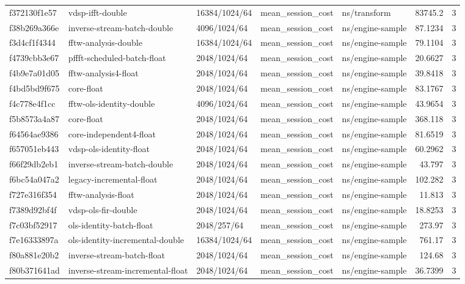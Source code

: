 \begin{longtable}{lllllrr}
f372130f1e57 & vdsp-ifft-double & 16384/1024/64 & mean\_session\_cost & ns/transform & 83745.2 & 3 \\
f38b269a366e & inverse-stream-batch-double & 4096/1024/64 & mean\_session\_cost & ns/engine-sample & 87.1234 & 3 \\
f3d4cf1f4344 & fftw-analysis-double & 16384/1024/64 & mean\_session\_cost & ns/engine-sample & 79.1104 & 3 \\
f4739cbb3e67 & pffft-scheduled-batch-float & 2048/1024/64 & mean\_session\_cost & ns/engine-sample & 20.6627 & 3 \\
f4b9e7a01d05 & fftw-analysis4-float & 2048/1024/64 & mean\_session\_cost & ns/engine-sample & 39.8418 & 3 \\
f4bd5bd9f675 & core-float & 2048/1024/64 & mean\_session\_cost & ns/engine-sample & 83.1767 & 3 \\
f4c778e4f1cc & fftw-ols-identity-double & 4096/1024/64 & mean\_session\_cost & ns/engine-sample & 43.9654 & 3 \\
f5b8573a4a87 & core-float & 2048/1024/64 & mean\_session\_cost & ns/engine-sample & 368.118 & 3 \\
f64564ae9386 & core-independent4-float & 2048/1024/64 & mean\_session\_cost & ns/engine-sample & 81.6519 & 3 \\
f657051eb443 & vdsp-ols-identity-float & 2048/1024/64 & mean\_session\_cost & ns/engine-sample & 60.2962 & 3 \\
f66f29db2eb1 & inverse-stream-batch-double & 2048/1024/64 & mean\_session\_cost & ns/engine-sample & 43.797 & 3 \\
f6bc54a047a2 & legacy-incremental-float & 2048/1024/64 & mean\_session\_cost & ns/engine-sample & 102.282 & 3 \\
f727e316f354 & fftw-analysis-float & 2048/1024/64 & mean\_session\_cost & ns/engine-sample & 11.813 & 3 \\
f7389d92bf4f & vdsp-ols-fir-double & 2048/1024/64 & mean\_session\_cost & ns/engine-sample & 18.8253 & 3 \\
f7c03bf52917 & ols-identity-batch-float & 2048/257/64 & mean\_session\_cost & ns/engine-sample & 273.97 & 3 \\
f7e16333897a & ols-identity-incremental-double & 16384/1024/64 & mean\_session\_cost & ns/engine-sample & 761.17 & 3 \\
f80a881e20b2 & inverse-stream-batch-float & 2048/1024/64 & mean\_session\_cost & ns/engine-sample & 124.68 & 3 \\
f80b371641ad & inverse-stream-incremental-float & 2048/1024/64 & mean\_session\_cost & ns/engine-sample & 36.7399 & 3 \\

\end{longtable}
